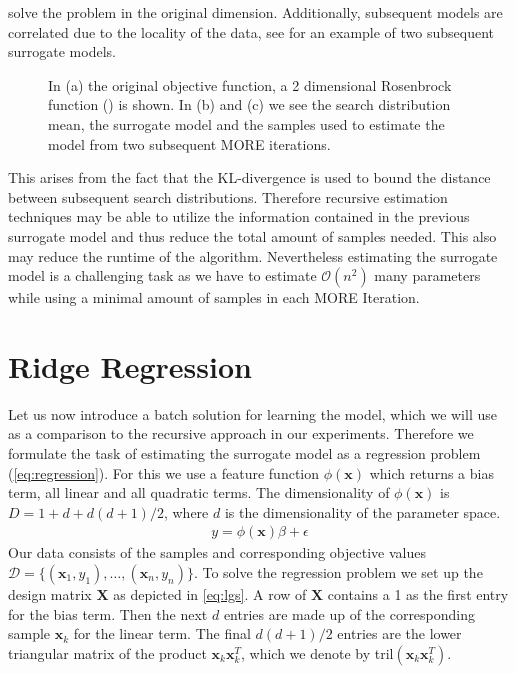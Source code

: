 solve the problem in the original dimension.
Additionally, subsequent models are correlated
due to the locality of the data, see  for an example of
two subsequent surrogate models.
\begin{figure}[t]
  \centering
  \caption{\small
    In (a) the original objective function,
    a 2 dimensional Rosenbrock function () is shown.
    In (b) and (c) we see the search distribution mean,
    the surrogate model and the samples used to estimate
    the model from two subsequent MORE iterations.}
 \label{fig:sur_model}
\end{figure}
This arises from the fact that the KL-divergence is
used to bound the distance between
subsequent search distributions. Therefore recursive estimation
techniques may be able to utilize the information contained in the previous
surrogate model and thus reduce the total amount of samples needed.
This also may reduce the runtime of the algorithm.
Nevertheless estimating the surrogate model is a challenging task as we
have to estimate $\mathcal{O}(n^2)$ many parameters while using a minimal
amount of samples in each MORE Iteration. 


\section{Ridge Regression}
\label{sec:ridge}
Let us now introduce a batch solution for learning the model,
which we will use as a comparison
to the recursive approach in our experiments.
Therefore we formulate the task of estimating the surrogate model as
a regression problem (\ref{eq:regression}). For this we use
a feature function $\phi(\mathbf{x})$ which returns
a bias term, all linear and all quadratic terms. The dimensionality of
$\phi(\mathbf{x})$ is $D = 1 + d + d(d + 1) / 2$, where $d$
is the dimensionality of the parameter space.
\begin{align}
  \label{eq:regression}
  y = \phi(\mathbf{x}) \beta + \epsilon
\end{align}
Our data consists of the samples and corresponding objective
values $\mathcal{D} = \{(\mathbf{x}_1, y_1),\dots,(\mathbf{x}_n, y_n)\}$.
To solve the regression problem we set up
the design matrix $\mathbf{X}$ as depicted in \cref{eq:lgs}.
A row of $\mathbf{X}$ contains a 1 as the first entry for the bias term.
Then the next $d$ entries are made up of the corresponding
sample $\mathbf{x}_k$ for the linear term.
The final $d(d + 1) / 2$  entries are
the lower triangular matrix of the product $\mathbf{x}_k \mathbf{x}_k^T$,
which we denote by tril$(\mathbf{x}_k \mathbf{x}_k^T)$.

